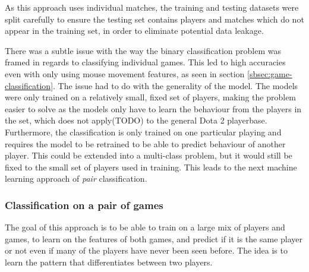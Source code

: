 \documentclass[Report.tex]{subfiles}
\begin{document}

As this approach uses individual matches, the training and testing datasets were split carefully to ensure the testing set contains players and matches which do not appear in the training set, in order to eliminate potential data leakage. 

There was a subtle issue with the way the binary classification problem was framed in regards to classifying individual games. This led to high accuracies even with only using mouse movement features, as seen in section \ref{sbsec:game-classification}. The issue had to do with the generality of the model. The models were only trained on a relatively small, fixed set of players, making the problem easier to solve as the models only have to learn the behaviour from the players in the set, which does not apply(TODO) to the general Dota 2 playerbase. Furthermore, the classification is only trained on one particular playing and requires the model to be retrained to be able to predict behaviour of another player. This could be extended into a multi-class problem, but it would still be fixed to the small set of players used in training. This leads to the next machine learning approach of \textit{pair} classification.

\subsubsection{Classification on a pair of games}
The goal of this approach is to be able to train on a large mix of players and games, to learn on the features of both games, and predict if it is the same player or not even if many of the players have never been seen before. The idea is to learn the pattern that differentiates between two players. 
\end{document}
